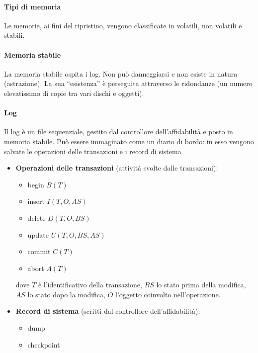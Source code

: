 \paragraph{Tipi di memoria} Le memorie, ai fini del ripristino, vengono classificate in volatili, non volatili e stabili. 
\paragraph{Memoria stabile} La memoria stabile ospita i log. Non può danneggiarsi e non esiste in natura (astrazione). La sua ``esistenza'' è perseguita attraverso le ridondanze (un numero elevatissimo di copie tra vari dischi e oggetti).
\paragraph{Log} Il log è un file sequenziale, gestito dal controllore dell'affidabilità e posto in memoria stabile. Può essere immaginato come un diario di bordo: in esso vengono salvate le operazioni delle transazioni e i record di sistema
\begin{itemize}
	\item \textbf{Operazioni delle transazioni} (attività svolte dalle transazioni):
	\begin{itemize}
		\item begin $B(T)$
		\item insert $I(T,O,AS)$
		\item delete $D(T,O,BS)$
		\item update $U(T,O,BS,AS)$
		\item commit $C(T)$
		\item abort $A(T)$
	\end{itemize}
	dove $T$ è l'identificativo della transazione, $BS$ lo stato prima della modifica, $AS$ lo stato dopo la modifica, $O$ l'oggetto coinvolto nell'operazione.
	\item \textbf{Record di sistema} (scritti dal controllore dell'affidabilità):
	\begin{itemize}
		\item dump
		\item checkpoint
	\end{itemize}
\end{itemize}

